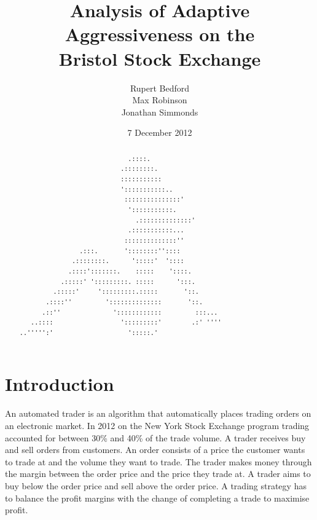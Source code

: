 \documentclass[preprint]{acm_proc_article-sp} %
\begin{document}
\title{Analysis of Adaptive Aggressiveness on the\\
Bristol Stock Exchange}
\author{
  \alignauthor
    Rupert Bedford\\
  \alignauthor
    Max Robinson\\
  \alignauthor
    Jonathan Simmonds
}
\date{7 December 2012}

\maketitle
\begin{abstract} \label{sec:abstract}
\begin{verbatim}
                             .::::. 
                           .::::::::. 
                           ::::::::::: 
                           ':::::::::::.. 
                            :::::::::::::::' 
                             ':::::::::::. 
                               .::::::::::::::' 
                             .:::::::::::... 
                            ::::::::::::::'' 
                .:::.       '::::::::'':::: 
              .::::::::.      ':::::'  ':::: 
             .::::':::::::.    :::::    '::::. 
           .:::::' ':::::::::. :::::      ':::. 
         .:::::'     ':::::::::.:::::       '::. 
       .::::''         '::::::::::::::       '::. 
      .::''              '::::::::::::         :::... 
   ..::::                  ':::::::::'        .:' '''' 
..''''':'                    ':::::.' 
\end{verbatim}
\end{abstract}

\section{Introduction} \label{sec:introduction}

An automated trader is an algorithm that automatically places trading orders on
an electronic market. In 2012 on the New York Stock Exchange program trading accounted for between 30\% and 40\% of the trade volume\cite{nyse_press}.
A trader receives buy and sell orders from customers. An order consists of a price the customer wants to trade at and the volume they want to trade.
The trader makes money through the margin between the order price and the price they trade at. A trader aims to buy below the order price and sell above the order price.
A trading strategy has to balance the profit margins with the change of completing a trade to maximise profit.
\end{document}
